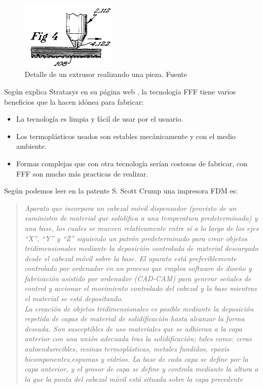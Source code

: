     \begin{figure}[H]
            \centering
            \includegraphics[width=0.4\textwidth]{images/capas_fdm.png}
            \caption{Detalle  de un extrusor realizando una pieza. Fuente  \cite{crump1992apparatus}}
            \label{fig:detalle_capas}
    \end{figure}
Según explica Stratasys en su página web \cite{FDMTechnology}, la tecnología FFF tiene varios beneficios que la hacen idónea para fabricar:
\begin{itemize}
    \item La tecnología es limpia y fácil de usar por el usuario.
    \item Los termoplásticos usados son estables mecánicamente y con el medio ambiente.
    \item Formas complejas que con otra tecnología serían costosas de fabricar, con FFF son mucho más practicas de realizar.
\end{itemize}

Según podemos leer en la patente S. Scott Crump \cite{crump1992apparatus} una impresora FDM es:

\begin{quotation}
\emph{
Aparato que incorpora un cabezal móvil dispensador (provisto de un suministro de material que solidifica a una temperatura predeterminada) y una base, los cuales se mueven relativamente entre sí a lo largo de los ejes “X”, “Y” y “Z” siguiendo un patrón predeterminado para crear objetos tridimensionales mediante la deposición controlada de material descargado desde el cabezal móvil sobre la base. El aparato está preferiblemente controlado por ordenador en un proceso que emplea software de diseño y fabricación asistido por ordenador (CAD-CAM) para generar señales de control y accionar el movimiento controlado del cabezal y la base mientras el material se está depositando.}\\

\emph{La creación de objetos tridimensionales es posible mediante la deposición repetida de  capas de material de solidificación hasta alcanzar la forma deseada. Son susceptibles de uso materiales que se adhieran a la capa anterior con una unión adecuada tras la solidificación; tales como: ceras autoendurecibles, resinas termoplásticas, metales fundidos, epoxis bicomponentes,espumas y vidrios. La base de cada capa se define por la capa anterior, y el grosor de capa se define y controla mediante la altura a la que la punta del cabezal móvil está situada sobre la capa precedente}

\end{quotation}

